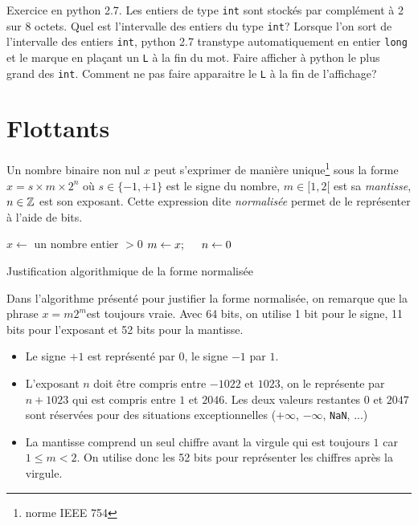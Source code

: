 Exercice en python 2.7.\newline
Les entiers de type \texttt{int} sont stockés par complément à 2 sur 8 octets. Quel est l'intervalle des entiers du type \texttt{int}?\newline
Lorsque l'on sort de l'intervalle des entiers \texttt{int}, python 2.7 transtype automatiquement en entier \texttt{long} et le marque en plaçant un \texttt{L} à la fin du mot. Faire afficher à python le plus grand des \texttt{int}. Comment ne pas faire apparaitre le \texttt{L} à la fin de l'affichage?   

\section{Flottants}
Un nombre binaire non nul $x$ peut s'exprimer de manière unique\footnote{norme IEEE 754} sous la forme $x = s\times m\times 2^n$ où $s\in\{-1,+1\}$ est le signe du nombre, $m\in [1,2[$ est sa \emph{mantisse}, $n\in \mathbb{Z}$ est son exposant.\newline
Cette expression dite \emph{normalisée} permet de le représenter à l'aide de bits.\newline
\begin{algorithm}
  $x \leftarrow $ un nombre entier $>0$\;
  $m \leftarrow x ; \hspace{0.5cm} n \leftarrow 0$\;
  \caption{Justification algorithmique de la forme normalisée}
  \end{algorithm}
Dans l'algorithme présenté pour justifier la forme normalisée, on remarque que la phrase \og$x = m 2^m$\fg est toujours vraie.
Avec 64 bits, on utilise 1 bit pour le signe, 11 bits pour l'exposant et 52 bits pour la mantisse.
\begin{itemize}
 \item Le signe $+1$ est représenté par $0$, le signe $-1$ par $1$.
 \item L'exposant $n$ doit être compris entre $-1022$ et $1023$, on le représente par $n + 1023$ qui est compris entre $1$ et $2046$. Les deux valeurs restantes $0$ et $2047$ sont réservées pour des situations exceptionnelles ($+\infty$, $-\infty$, \verb|NaN|, ...)
 \item La mantisse comprend un seul chiffre avant la virgule qui est toujours $1$ car $1\leq m <2$. On utilise donc les 52 bits pour représenter les chiffres après la virgule. 
\end{itemize}
